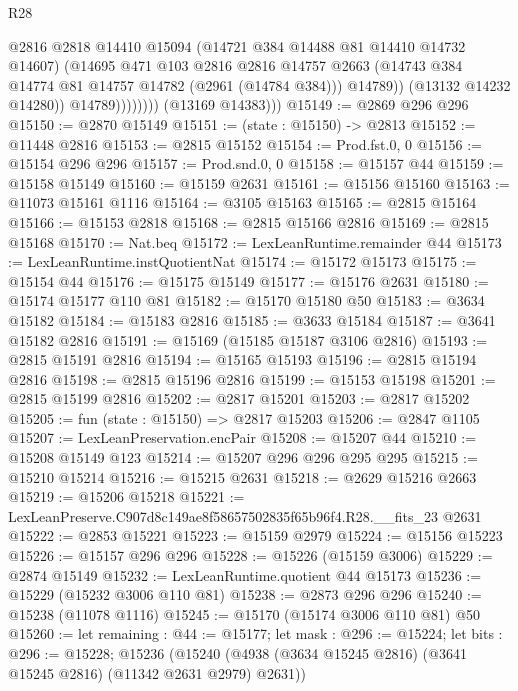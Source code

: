 \begin{lexlean}{R28}
\begin{coremodule}
                            @2816
                            @2818
                            @14410
                            @15094
                            (@14721 @384 @14488 @81 @14410 @14732 @14607)
                            (@14695
                              @471
                              @103
                              @2816
                              @2816
                              @14757
                              @2663
                              (@14743 @384 @14774 @81 @14757 @14782 (@2961 (@14784 @384)))
                              @14789))
                          (@13132 @14232 @14280))
                        @14789))))))))
        (@13169 @14383)))
@15149 := @2869 @296 @296
@15150 := @2870 @15149
@15151 := (state : @15150) -> @2813
@15152 := @11448 @2816
@15153 := @2815 @15152
@15154 := Prod.fst.{0, 0}
@15156 := @15154 @296 @296
@15157 := Prod.snd.{0, 0}
@15158 := @15157 @44
@15159 := @15158 @15149
@15160 := @15159 @2631
@15161 := @15156 @15160
@15163 := @11073 @15161 @1116
@15164 := @3105 @15163
@15165 := @2815 @15164
@15166 := @15153 @2818
@15168 := @2815 @15166 @2816
@15169 := @2815 @15168
@15170 := Nat.beq
@15172 := LexLeanRuntime.remainder @44
@15173 := LexLeanRuntime.instQuotientNat
@15174 := @15172 @15173
@15175 := @15154 @44
@15176 := @15175 @15149
@15177 := @15176 @2631
@15180 := @15174 @15177 @110 @81
@15182 := @15170 @15180 @50
@15183 := @3634 @15182
@15184 := @15183 @2816
@15185 := @3633 @15184
@15187 := @3641 @15182 @2816
@15191 := @15169 (@15185 @15187 @3106 @2816)
@15193 := @2815 @15191 @2816
@15194 := @15165 @15193
@15196 := @2815 @15194 @2816
@15198 := @2815 @15196 @2816
@15199 := @15153 @15198
@15201 := @2815 @15199 @2816
@15202 := @2817 @15201
@15203 := @2817 @15202
@15205 := fun (state : @15150) => @2817 @15203
@15206 := @2847 @1105
@15207 := LexLeanPreservation.encPair
@15208 := @15207 @44
@15210 := @15208 @15149 @123
@15214 := @15207 @296 @296 @295 @295
@15215 := @15210 @15214
@15216 := @15215 @2631
@15218 := @2629 @15216 @2663
@15219 := @15206 @15218
@15221 := LexLeanPreserve.C907d8c149ae8f58657502835f65b96f4.R28.__fits_23 @2631
@15222 := @2853 @15221
@15223 := @15159 @2979
@15224 := @15156 @15223
@15226 := @15157 @296 @296
@15228 := @15226 (@15159 @3006)
@15229 := @2874 @15149
@15232 := LexLeanRuntime.quotient @44 @15173
@15236 := @15229 (@15232 @3006 @110 @81)
@15238 := @2873 @296 @296
@15240 := @15238 (@11078 @1116)
@15245 := @15170 (@15174 @3006 @110 @81) @50
@15260 := let remaining : @44 := @15177;
  let mask : @296 := @15224;
  let bits : @296 := @15228;
  @15236 (@15240 (@4938 (@3634 @15245 @2816) (@3641 @15245 @2816) (@11342 @2631 @2979) @2631))

\end{coremodule}
\end{lexlean}
